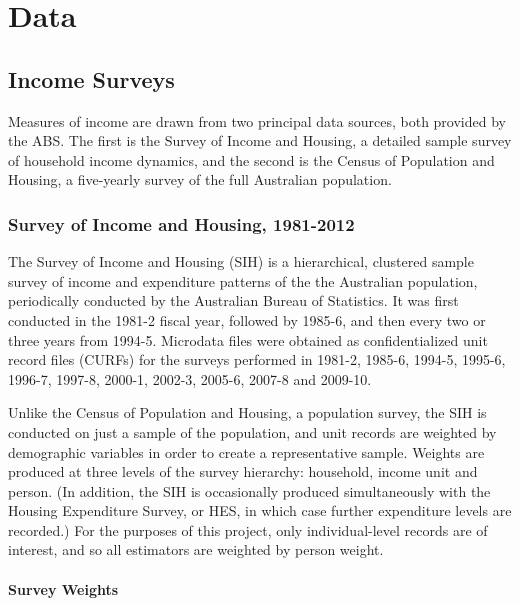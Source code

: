 \chapter{Data}
\label{app:data}

\section{Income Surveys}

Measures of income are drawn from two principal data sources, both provided by the ABS. The first is the Survey of Income and Housing, a detailed sample survey of household income dynamics, and the second is the Census of Population and Housing, a five-yearly survey of the full Australian population. 

\subsection{Survey of Income and Housing, 1981-2012}
\label{sec:SIH}


The Survey of Income and Housing (SIH) is a hierarchical, clustered sample survey of income and expenditure patterns of the the Australian population, periodically conducted by the Australian Bureau of Statistics. It was first conducted in the 1981-2 fiscal year, followed by 1985-6, and then every two or three years from 1994-5. Microdata files were obtained as confidentialized unit record files (CURFs) for the surveys performed in 1981-2, 1985-6, 1994-5, 1995-6, 1996-7, 1997-8, 2000-1, 2002-3, 2005-6, 2007-8 and 2009-10.

Unlike the Census of Population and Housing, a population survey, the SIH is conducted on just a sample of the population, and unit records are weighted by demographic variables in order to create a representative sample. Weights are produced at three levels of the survey hierarchy: household, income unit and person. (In addition, the SIH is occasionally produced simultaneously with the Housing Expenditure Survey, or HES, in which case further expenditure levels are recorded.) For the purposes of this project, only individual-level records are of interest, and so all estimators are weighted by person weight.

\subsubsection{Survey Weights}

